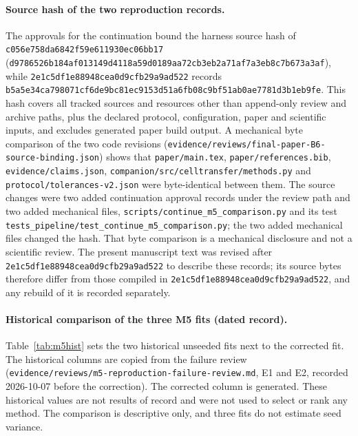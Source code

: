 \documentclass[11pt]{article}
\newcommand{\cfailid}{\nolinkurl{c056e758da6842f59e611930ec06bb17}}
\newcommand{\ccontid}{\nolinkurl{2e1c5df1e88948cea0d9cfb29a9ad522}}
\begin{document}
\paragraph{Source hash of the two reproduction records.} The approvals for the continuation bound the harness source hash of \cfailid{} (\nolinkurl{d9786526b184af013149d4118a59d0189aa72cb3eb2a71af7a3eb8c7b673a3af}), while \ccontid{} records \nolinkurl{b5a5e34ca798071cf6de9bc81ec9153d51a6fb08c9bf51ab0ae7781d3b1eb9fe}. This hash covers all tracked sources and resources other than append-only review and archive paths, plus the declared protocol, configuration, paper and scientific inputs, and excludes generated paper build output. A mechanical byte comparison of the two code revisions (\nolinkurl{evidence/reviews/final-paper-B6-source-binding.json}) shows that \nolinkurl{paper/main.tex}, \nolinkurl{paper/references.bib}, \nolinkurl{evidence/claims.json}, \nolinkurl{companion/src/celltransfer/methods.py} and \nolinkurl{protocol/tolerances-v2.json} were byte-identical between them. The source changes were two added continuation approval records under the review path and two added mechanical files, \nolinkurl{scripts/continue_m5_comparison.py} and its test \nolinkurl{tests_pipeline/test_continue_m5_comparison.py}; the two added mechanical files changed the hash. That byte comparison is a mechanical disclosure and not a scientific review. The present manuscript text was revised after \ccontid{} to describe these records; its source bytes therefore differ from those compiled in \ccontid, and any rebuild of it is recorded separately.

\paragraph{Historical comparison of the three M5 fits (dated record).} Table~\ref{tab:m5hist} sets the two historical unseeded fits next to the corrected fit. The historical columns are copied from the failure review (\nolinkurl{evidence/reviews/m5-reproduction-failure-review.md}, E1 and E2, recorded 2026-10-07 before the correction). The corrected column is generated. These historical values are not results of record and were not used to select or rank any method. The comparison is descriptive only, and three fits do not estimate seed variance.
\end{document}

